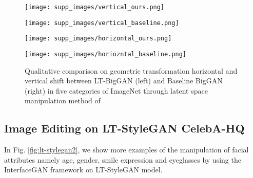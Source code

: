 \documentclass[10pt,twocolumn,letterpaper]{article}
\begin{document}
\begin{figure*}[t]
\centering
    \begin{minipage}{.48\textwidth}
    \texttt{[image: supp\_images/vertical\_ours.png]}
    \end{minipage}\hspace{0.05cm}
    \begin{minipage}{.48\textwidth}
    \texttt{[image: supp\_images/vertical\_baseline.png]}
    \end{minipage}
    \begin{minipage}{.48\textwidth}
    \texttt{[image: supp\_images/horizontal\_ours.png]}
    \end{minipage}\hspace{0.05cm}
    \begin{minipage}{.48\textwidth}
    \texttt{[image: supp\_images/horiozntal\_baseline.png]}
    \end{minipage}
    \caption{\footnotesize{Qualitative comparison on geometric transformation horizontal and vertical shift between LT-BigGAN (left) and Baseline BigGAN (right) in five categories of ImageNet through latent space manipulation method of \cite{controlling2020iclr}}}
    \label{fig:lt-biggan_imagenet_horizontal_vertical}
\end{figure*}



\subsection{Image Editing on LT-StyleGAN CelebA-HQ }\label{sec:stylegan}
In Fig. \ref{fig:lt-stylegan2}, we show more examples of the manipulation of facial attributes namely age, gender, smile expression and eyeglasses by using the InterfaceGAN framework \cite{interface2020shen} on LT-StyleGAN model.
\end{document}
